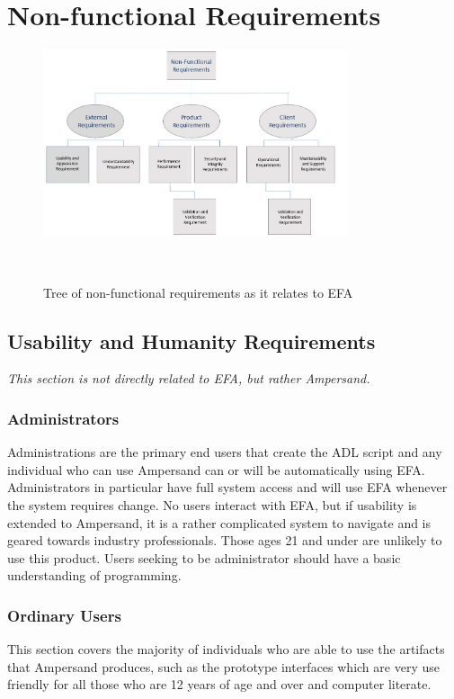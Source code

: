 \documentclass[12pt]{report}
\begin{document}
\chapter{Non-functional Requirements}\label{ch:NonFunc}
\begin{figure}[!htb]
	\centering
	\includegraphics[width=0.8\textwidth]{../figures/NONFUNCTIONAL}
	\caption{Tree of non-functional requirements as it relates to EFA}~\label{fig:figure2}
\end{figure}
\section{Usability and Humanity Requirements}\label{sec:Usability}
\textit{This section is not directly related to EFA, but rather Ampersand.}
\subsection{Administrators}
Administrations are the primary end users that create the ADL script and any 
individual who can use Ampersand can or will be automatically using EFA. 
Administrators in particular have full system access and will use EFA whenever 
the system requires change. No users interact with EFA, but if usability is 
extended to Ampersand, it is a rather complicated system to navigate and is 
geared towards industry professionals. Those ages 21 and under are unlikely to 
use this product. Users seeking to be administrator should have a basic 
understanding of programming.
\subsection{Ordinary Users}
This section covers the majority of individuals who are able to use the 
artifacts that Ampersand produces, such as the prototype interfaces which are 
very use friendly for all those who are 12 years of age and over and computer 
literate.
\end{document}
